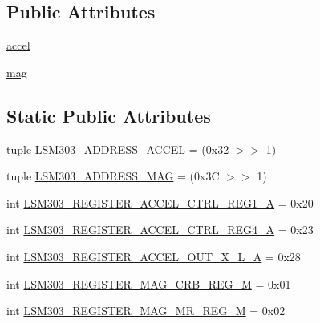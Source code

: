 \subsection*{Public Attributes}
\begin{DoxyCompactItemize}
\item 
\hyperlink{classdriver_1_1DRIVER__CORE_1_1Adafruit__LSM303_a17adc9c743af3a5829980b8a702c64d1}{accel}
\item 
\hyperlink{classdriver_1_1DRIVER__CORE_1_1Adafruit__LSM303_a2afbe1cbd59ce00af91d9e431eb2b391}{mag}
\end{DoxyCompactItemize}
\subsection*{Static Public Attributes}
\begin{DoxyCompactItemize}
\item 
tuple \hyperlink{classdriver_1_1DRIVER__CORE_1_1Adafruit__LSM303_a24ad319884adc1c09dd29f423b8b6692}{L\+S\+M303\+\_\+\+A\+D\+D\+R\+E\+S\+S\+\_\+\+A\+C\+C\+E\+L} = (0x32 $>$$>$ 1)
\item 
tuple \hyperlink{classdriver_1_1DRIVER__CORE_1_1Adafruit__LSM303_a0b503ed9efa5d7a4d6edc9e02d1cd61f}{L\+S\+M303\+\_\+\+A\+D\+D\+R\+E\+S\+S\+\_\+\+M\+A\+G} = (0x3\+C $>$$>$ 1)
\item 
int \hyperlink{classdriver_1_1DRIVER__CORE_1_1Adafruit__LSM303_ac907d5dc53fef3f3a59a99e7dd969de2}{L\+S\+M303\+\_\+\+R\+E\+G\+I\+S\+T\+E\+R\+\_\+\+A\+C\+C\+E\+L\+\_\+\+C\+T\+R\+L\+\_\+\+R\+E\+G1\+\_\+\+A} = 0x20
\item 
int \hyperlink{classdriver_1_1DRIVER__CORE_1_1Adafruit__LSM303_ab9fecee305847de9273f660412fccf01}{L\+S\+M303\+\_\+\+R\+E\+G\+I\+S\+T\+E\+R\+\_\+\+A\+C\+C\+E\+L\+\_\+\+C\+T\+R\+L\+\_\+\+R\+E\+G4\+\_\+\+A} = 0x23
\item 
int \hyperlink{classdriver_1_1DRIVER__CORE_1_1Adafruit__LSM303_a9db7d714f9448a3ac4121457f1996634}{L\+S\+M303\+\_\+\+R\+E\+G\+I\+S\+T\+E\+R\+\_\+\+A\+C\+C\+E\+L\+\_\+\+O\+U\+T\+\_\+\+X\+\_\+\+L\+\_\+\+A} = 0x28
\item 
int \hyperlink{classdriver_1_1DRIVER__CORE_1_1Adafruit__LSM303_a9ce34b06b2a881fe87f4acf7275e788d}{L\+S\+M303\+\_\+\+R\+E\+G\+I\+S\+T\+E\+R\+\_\+\+M\+A\+G\+\_\+\+C\+R\+B\+\_\+\+R\+E\+G\+\_\+\+M} = 0x01
\item 
int \hyperlink{classdriver_1_1DRIVER__CORE_1_1Adafruit__LSM303_af17a9acb25451a4a2c5f388ff6f95754}{L\+S\+M303\+\_\+\+R\+E\+G\+I\+S\+T\+E\+R\+\_\+\+M\+A\+G\+\_\+\+M\+R\+\_\+\+R\+E\+G\+\_\+\+M} = 0x02
\item 

\end{DoxyCompactItemize}
